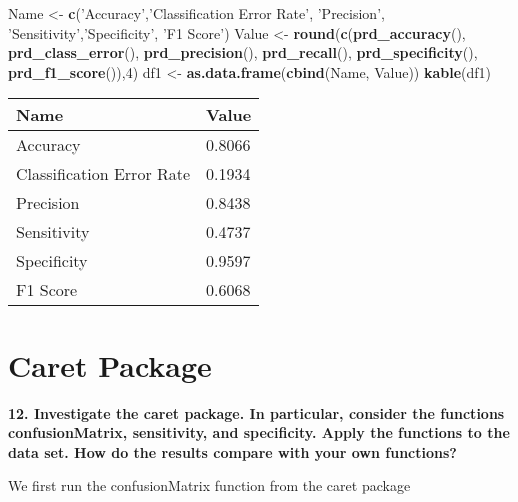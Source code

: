 \documentclass[]{article}
\newenvironment{Shaded}{\begin{snugshade}}{\end{snugshade}}
\newcommand{\DataTypeTok}[1]{\textcolor[rgb]{0.13,0.29,0.53}{#1}}
\newcommand{\DecValTok}[1]{\textcolor[rgb]{0.00,0.00,0.81}{#1}}
\newcommand{\KeywordTok}[1]{\textcolor[rgb]{0.13,0.29,0.53}{\textbf{#1}}}
\newcommand{\NormalTok}[1]{#1}
\newcommand{\OperatorTok}[1]{\textcolor[rgb]{0.81,0.36,0.00}{\textbf{#1}}}
\newcommand{\StringTok}[1]{\textcolor[rgb]{0.31,0.60,0.02}{#1}}
\begin{document}
\begin{Shaded}
\begin{Highlighting}[]
\NormalTok{Name <-}\StringTok{ }\KeywordTok{c}\NormalTok{(}\StringTok{'Accuracy'}\NormalTok{,}\StringTok{'Classification Error Rate'}\NormalTok{, }\StringTok{'Precision'}\NormalTok{, }\StringTok{'Sensitivity'}\NormalTok{,}\StringTok{'Specificity'}\NormalTok{, }\StringTok{'F1 Score'}\NormalTok{)}
\NormalTok{Value <-}\StringTok{ }\KeywordTok{round}\NormalTok{(}\KeywordTok{c}\NormalTok{(}\KeywordTok{prd_accuracy}\NormalTok{(), }\KeywordTok{prd_class_error}\NormalTok{(), }\KeywordTok{prd_precision}\NormalTok{(), }\KeywordTok{prd_recall}\NormalTok{(), }\KeywordTok{prd_specificity}\NormalTok{(), }\KeywordTok{prd_f1_score}\NormalTok{()),}\DecValTok{4}\NormalTok{)}
\NormalTok{df1 <-}\StringTok{ }\KeywordTok{as.data.frame}\NormalTok{(}\KeywordTok{cbind}\NormalTok{(Name, Value))}
\KeywordTok{kable}\NormalTok{(df1)}
\end{Highlighting}
\end{Shaded}

\begin{longtable}[]{@{}ll@{}}
\toprule
Name & Value\tabularnewline
\midrule
\endhead
Accuracy & 0.8066\tabularnewline
Classification Error Rate & 0.1934\tabularnewline
Precision & 0.8438\tabularnewline
Sensitivity & 0.4737\tabularnewline
Specificity & 0.9597\tabularnewline
F1 Score & 0.6068\tabularnewline
\bottomrule
\end{longtable}

\hypertarget{caret-package}{%
\section{Caret Package}\label{caret-package}}

\textbf{12. Investigate the caret package. In particular, consider the
functions confusionMatrix, sensitivity, and specificity. Apply the
functions to the data set. How do the results compare with your own
functions?}

We first run the confusionMatrix function from the caret package

\begin{Shaded}
\end{Shaded}
\end{document}
